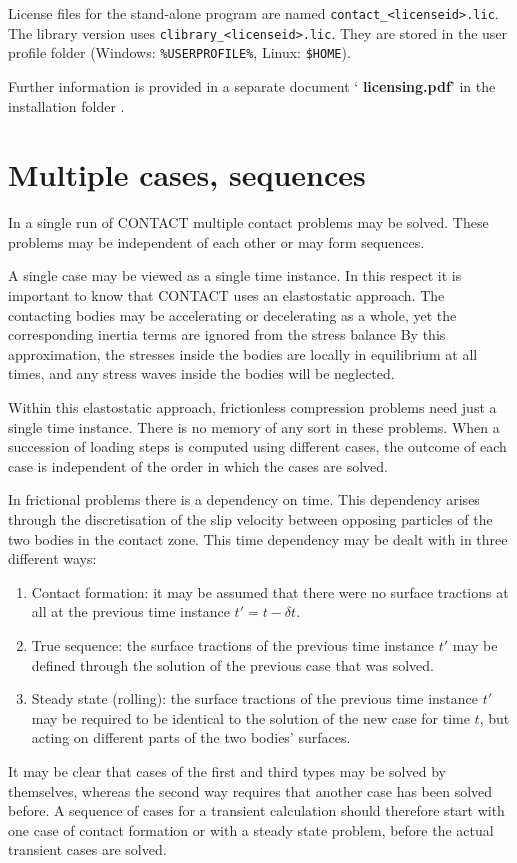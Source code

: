 \documentclass[12pt]{report}
\begin{document}
License files for the stand-alone program are named
\verb+contact_<licenseid>.lic+. The library version uses 
\verb+clibrary_<licenseid>.lic+. They are stored in
the user profile folder (Windows: \verb+%USERPROFILE%+, Linux:
\verb+$HOME+). 

Further information is provided in a separate document `{\bf
licensing.pdf}' in the installation folder \cite{memo21004-licensing}.

\section{Multiple cases, sequences}
\label{sec:cases}

In a single run of CONTACT multiple contact problems may be solved. These
problems may be independent of each other or may form sequences.

A single case may be viewed as a single time instance. In this respect it
is important to know that CONTACT uses an elastostatic approach. The
contacting bodies may be accelerating or decelerating as a whole, yet 
the corresponding inertia terms are ignored from the stress balance
By this approximation, the stresses inside the bodies are locally in
equilibrium at all times, and any stress waves inside the bodies will
be neglected.

Within this elastostatic approach, frictionless compression problems
need just a single time instance. There is no memory of any sort in these
problems. When a succession of loading steps is computed using different
cases, the outcome of each case is independent of the order in which the
cases are solved.

In frictional problems there is a dependency on time. This dependency
arises through the discretisation of the slip velocity 
between opposing particles of the two bodies in the contact zone. This
time dependency may be dealt with in three different ways:
\begin{enumerate}
\item Contact formation: it may be assumed that there were no surface
        tractions at all at the previous time instance $t'=t-\delta t$.
\item True sequence: the surface tractions of the previous time instance
        $t'$ may be defined through the solution of the previous case that
        was solved.
\item Steady state (rolling): the surface tractions of the previous time
        instance $t'$ may be required to be identical to the solution of
        the new case for time $t$, but acting on different parts of the two
        bodies' surfaces.
\end{enumerate}
It may be clear that cases of the first and third types may be solved by
themselves, whereas the second way requires that another case has been
solved before. A sequence of cases for a transient calculation should
therefore start with one case of contact formation or with a steady state
problem, before the actual transient cases are solved.
\end{document}
